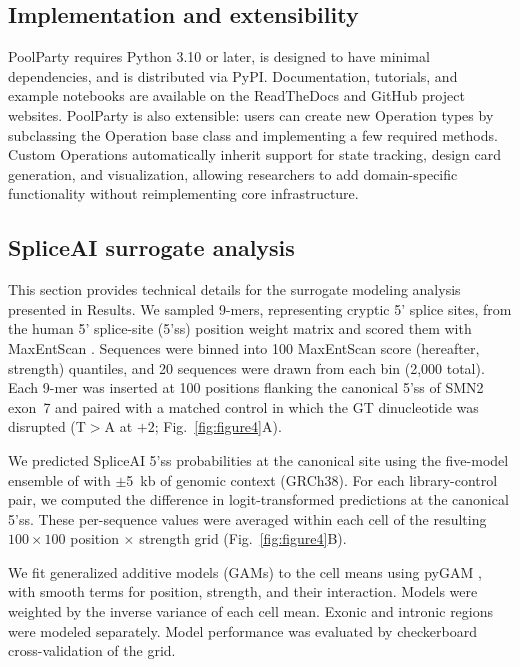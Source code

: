 \documentclass[twoside]{kinneylab_preprintstyle}
\begin{document}
\subsection{Implementation and extensibility}

PoolParty requires Python 3.10 or later, is designed to have minimal dependencies, and is distributed via PyPI. Documentation, tutorials, and example notebooks are available on the ReadTheDocs and GitHub project websites. PoolParty is also extensible: users can create new Operation types by subclassing the Operation base class and implementing a few required methods. Custom Operations automatically inherit support for state tracking, design card generation, and visualization, allowing researchers to add domain-specific functionality without reimplementing core infrastructure.

\subsection{SpliceAI surrogate analysis}

This section provides technical details for the surrogate modeling analysis presented in Results. We sampled 9-mers, representing cryptic 5' splice sites, from the human 5' splice-site (5'ss) position weight matrix \citep{Wong2018quantitative} and scored them with MaxEntScan \citep{Yeo2004me}. Sequences were binned into 100 MaxEntScan score (hereafter, strength) quantiles, and 20 sequences were drawn from each bin (2,000 total). Each 9-mer was inserted at 100 positions flanking the canonical 5'ss of SMN2 exon~7 and paired with a matched control in which the GT dinucleotide was disrupted (T$>$A at $+2$; Fig.~\ref{fig:figure4}A).

We predicted SpliceAI 5'ss probabilities at the canonical site using the five-model ensemble of \citet{Jaganathan2019ps} with $\pm$5~kb of genomic context (GRCh38). For each library-control pair, we computed the difference in logit-transformed predictions at the canonical 5'ss. These per-sequence values were averaged within each cell of the resulting $100 \times 100$ position $\times$ strength grid (Fig.~\ref{fig:figure4}B).

We fit generalized additive models (GAMs) to the cell means using pyGAM \citep{Serven2018pg}, with smooth terms for position, strength, and their interaction. Models were weighted by the inverse variance of each cell mean. Exonic and intronic regions were modeled separately. Model performance was evaluated by checkerboard cross-validation of the grid.
\end{document}
